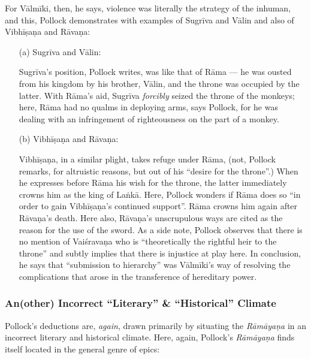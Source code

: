 For Vālmīki, then, he says, violence was literally the strategy of the inhuman, and this, Pollock demonstrates with examples of Sugrīva and Vālin and also of Vibhīṣaṇa and Rāvaṇa: 
\begin{itemize}
\item[(a)] Sugrīva and Vālin:

Sugrīva’s position, Pollock writes, was like that of Rāma --- he was ousted from his kingdom by his brother, Vālin, and the throne was occupied by the latter. With Rāma’s aid, Sugrīva {\sl forcibly} seized the throne of the monkeys; here, Rāma had no qualms in deploying arms, says Pollock, for he was dealing with an infringement of righteousness on the part of a monkey. 

\newpage

\item[(b)] Vibhīṣaṇa and Rāvaṇa: 

Vibhīṣaṇa, in a similar plight, takes refuge under Rāma, (not, Pollock remarks, for altruistic reasons, but out of his “desire for the throne”.) When he expresses before Rāma his wish for the throne, the latter immediately crowns him as the king of Laṅkā. Here, Pollock wonders if Rāma does so “in order to gain Vibhīṣaṇa’s continued support”. Rāma crowns him again after Rāvaṇa’s death. Here also, Rāvaṇa’s unscrupulous ways are cited as the reason for the use of the sword. As a side note, Pollock observes that there is no mention of Vaiśravaṇa who is “theoretically the rightful heir to the throne” and subtly implies that there is injustice at play here. In conclusion, he says that “submission to hierarchy” was Vālmīki’s way of resolving the complications that arose in the transference of hereditary power. 
\end{itemize}

\subsubsection{An(other) Incorrect “Literary” \& “Historical” Climate}\label{sec1.2.3.1}

Pollock’s deductions are, {\sl again}, drawn primarily by situating the {\sl Rāmāyaṇa} in an incorrect literary and historical climate. Here, again, Pollock’s {\sl Rāmāyaṇa} finds itself located in the general genre of epics:

